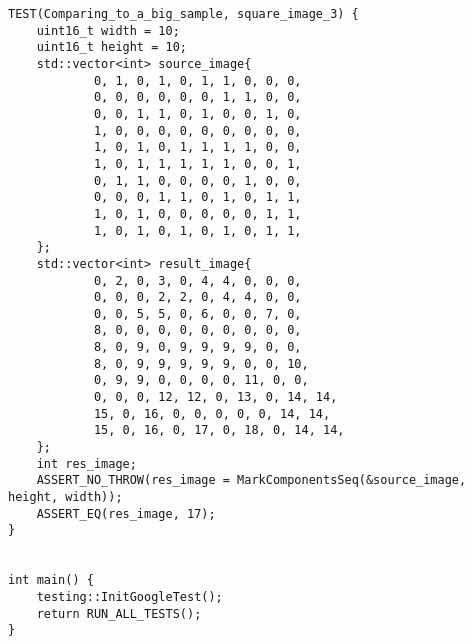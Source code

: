 \documentclass{report}
\begin{document}
\begin{lstlisting}
TEST(Comparing_to_a_big_sample, square_image_3) {
    uint16_t width = 10;
    uint16_t height = 10;
    std::vector<int> source_image{
            0, 1, 0, 1, 0, 1, 1, 0, 0, 0,
            0, 0, 0, 0, 0, 0, 1, 1, 0, 0,
            0, 0, 1, 1, 0, 1, 0, 0, 1, 0,
            1, 0, 0, 0, 0, 0, 0, 0, 0, 0,
            1, 0, 1, 0, 1, 1, 1, 1, 0, 0,
            1, 0, 1, 1, 1, 1, 1, 0, 0, 1,
            0, 1, 1, 0, 0, 0, 0, 1, 0, 0,
            0, 0, 0, 1, 1, 0, 1, 0, 1, 1,
            1, 0, 1, 0, 0, 0, 0, 0, 1, 1,
            1, 0, 1, 0, 1, 0, 1, 0, 1, 1,
    };
    std::vector<int> result_image{
            0, 2, 0, 3, 0, 4, 4, 0, 0, 0,
            0, 0, 0, 2, 2, 0, 4, 4, 0, 0,
            0, 0, 5, 5, 0, 6, 0, 0, 7, 0,
            8, 0, 0, 0, 0, 0, 0, 0, 0, 0,
            8, 0, 9, 0, 9, 9, 9, 9, 0, 0,
            8, 0, 9, 9, 9, 9, 9, 0, 0, 10,
            0, 9, 9, 0, 0, 0, 0, 11, 0, 0,
            0, 0, 0, 12, 12, 0, 13, 0, 14, 14,
            15, 0, 16, 0, 0, 0, 0, 0, 14, 14,
            15, 0, 16, 0, 17, 0, 18, 0, 14, 14,
    };
    int res_image;
    ASSERT_NO_THROW(res_image = MarkComponentsSeq(&source_image, height, width));
    ASSERT_EQ(res_image, 17);
}


int main() {
    testing::InitGoogleTest();
    return RUN_ALL_TESTS();
}


\end{lstlisting}
\end{document}

